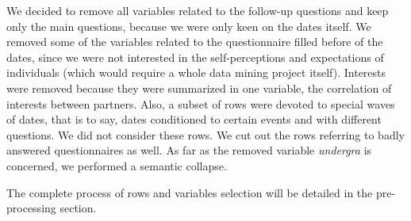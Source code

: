 We decided to remove all variables related to the follow-up questions and keep only the main questions, because we were only keen on the dates itself. We removed some of the variables related to the questionnaire filled before of the dates, since we were not interested in the self-perceptions and expectations of individuals (which would require a whole data mining project itself). Interests were removed because they were summarized in one variable, the correlation of interests between partners. Also, a subset of rows were devoted to special waves of dates, that is to say, dates conditioned to certain events and with different questions. We did not consider these rows. We cut out the rows referring to badly answered questionnaires as well. As far as the removed variable \textit{undergra} is concerned, we performed a semantic collapse.

The complete process of rows and variables selection will be detailed in the pre-processing section.

